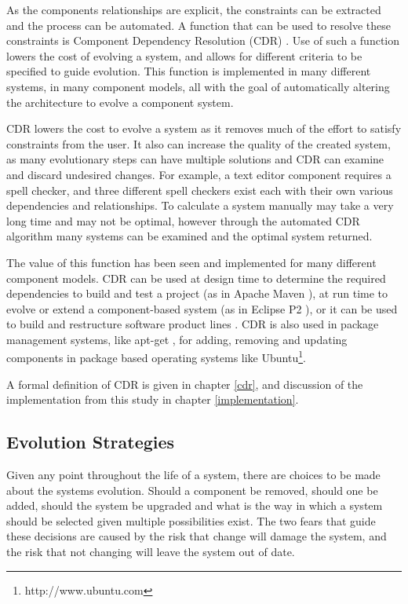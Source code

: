 As the components relationships are explicit, the constraints can be extracted and the process can be automated.
A function that can be used to resolve these constraints is Component Dependency Resolution (CDR) \cite{Jenson2010}.
Use of such a function lowers the cost of evolving a system, and allows for different criteria to be specified to guide evolution.
This function is implemented in many different systems, in many component models, all with the goal of automatically altering the architecture to evolve a component system.

CDR lowers the cost to evolve a system as it removes much of the effort to satisfy constraints from the user.
It also can increase the quality of the created system, as many evolutionary steps can have multiple solutions and CDR can examine and discard undesired changes.
For example, a  text editor component requires a spell checker, and three different spell checkers exist each with their own various dependencies and relationships.
To calculate a system manually may take a very long time and may not be optimal, however through the automated CDR algorithm many systems can be examined and the optimal system returned.

The value of this function has been seen and implemented for many different component models.
CDR can be used at design time to determine the required dependencies to build and test a project (as in Apache Maven \cite{casey_better_2008}),
at run time to evolve or extend a component-based system (as in Eclipse P2 \cite{leBerre2010}),
or it can be used to build and restructure software product lines \cite{savolainen_analyzing_2007}.
CDR is also used in package management systems, like apt-get \cite{Barth2005},
for adding, removing and updating components in package based operating systems like Ubuntu\footnote{http://www.ubuntu.com}. 

A formal definition of CDR is given in chapter \ref{cdr}, and discussion of the implementation from this study in chapter \ref{implementation}.

\subsection{Evolution Strategies}
Given any point throughout the life of a system, there are choices to be made about the systems evolution.
Should a component be removed, should one be added, should the system be upgraded and what is the way in which a system should be selected given multiple possibilities exist.
The two fears that guide these decisions are caused by the risk that change will damage the system, and the risk that not changing will leave the system out of date.


